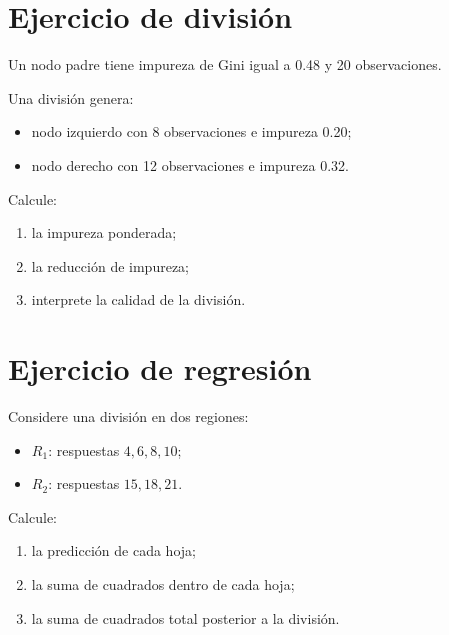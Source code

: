 \documentclass[
  spanish,
  10.5pt,
  letterpaper,
  DIV=11,
  numbers=noendperiod,
  oneside,
  open=any]{scrreprt}
\providecommand{\tightlist}{%
  \setlength{\itemsep}{0pt}\setlength{\parskip}{0pt}}
\theoremstyle{definition}
\theoremstyle{definition}
\theoremstyle{plain}
\theoremstyle{remark}
\begin{document}
\section*{Ejercicio de división}\label{ejercicio-de-divisiuxf3n}


Un nodo padre tiene impureza de Gini igual a 0.48 y 20 observaciones.

Una división genera:

\begin{itemize}
\tightlist
\item
  nodo izquierdo con 8 observaciones e impureza 0.20;
\item
  nodo derecho con 12 observaciones e impureza 0.32.
\end{itemize}

Calcule:

\begin{enumerate}
\def\labelenumi{\arabic{enumi}.}
\tightlist
\item
  la impureza ponderada;
\item
  la reducción de impureza;
\item
  interprete la calidad de la división.
\end{enumerate}

\section*{Ejercicio de regresión}\label{ejercicio-de-regresiuxf3n-1}


Considere una división en dos regiones:

\begin{itemize}
\tightlist
\item
  \(R_1\): respuestas \(4,6,8,10\);
\item
  \(R_2\): respuestas \(15,18,21\).
\end{itemize}

Calcule:

\begin{enumerate}
\def\labelenumi{\arabic{enumi}.}
\tightlist
\item
  la predicción de cada hoja;
\item
  la suma de cuadrados dentro de cada hoja;
\item
  la suma de cuadrados total posterior a la división.
\end{enumerate}
\end{document}
